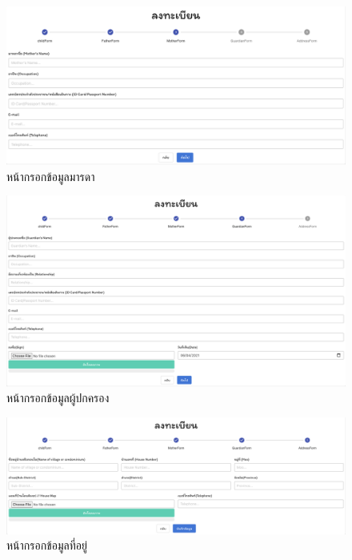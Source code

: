 \begin{itemize}
  
    \begin{figure}
      \begin{center}
      \includegraphics[width=\linewidth]{images/motherForm.png}
      \end{center}
      \caption[หน้ากรอกข้อมูลมารดา]{หน้ากรอกข้อมูลมารดา}
      \label{fig:motherForm}
    \end{figure}
  
  
    \begin{figure}
      \begin{center}
      \includegraphics[width=\linewidth]{images/guardiansForm.png}
      \end{center}
      \caption[หน้ากรอกข้อมูลผู้ปกครอง]{หน้ากรอกข้อมูลผู้ปกครอง}
      \label{fig:guardiansForm}
    \end{figure}
  
  
    \begin{figure}
      \begin{center}
      \includegraphics[width=\linewidth]{images/addressForm.png}
      \end{center}
      \caption[หน้ากรอกข้อมูลที่อยู่]{หน้ากรอกข้อมูลที่อยู่}
      \label{fig:addressForm}
    \end{figure}
  

\end{itemize}

